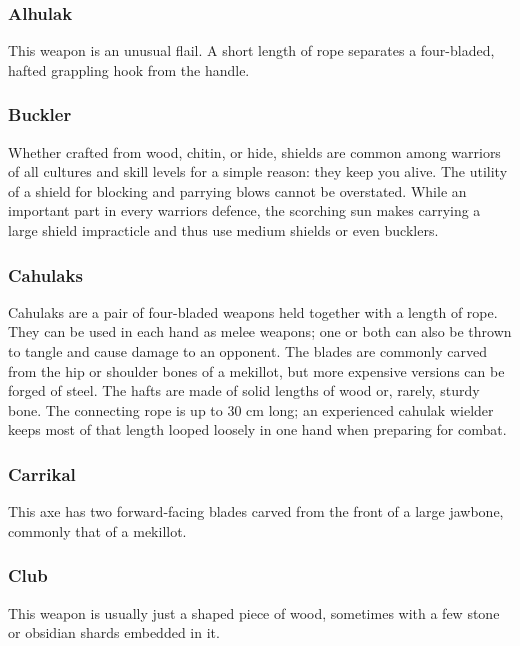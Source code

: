 \begin{multicols}{2}

\subsubsection{Alhulak}
\label{itmmlee:alhulak}
This weapon is an unusual flail. A short length of rope separates
a four-bladed, hafted grappling hook from the handle.

\subsubsection{Buckler}
\label{itmmlee:buckler}
Whether crafted from wood, chitin, or hide, shields are
common among warriors of all cultures and skill levels for
a simple reason: they keep you alive. The utility of a shield
for blocking and parrying blows cannot be overstated. While
an important part in every warriors defence, the scorching sun
makes carrying a large shield impracticle and thus use medium
shields or even bucklers.

\subsubsection{Cahulaks}
\label{itmmlee:cahulaks}
Cahulaks are a pair of four-bladed weapons held together with a length of rope. They
can be used in each hand as melee weapons; one or both can also be thrown to tangle
and cause damage to an opponent. The blades are commonly carved from the hip or
shoulder bones of a mekillot, but more expensive versions can be forged of steel.
The hafts are made of solid lengths of wood or, rarely, sturdy bone. The connecting
rope is up to 30 cm long; an experienced cahulak wielder keeps most of that length
looped loosely in one hand when preparing for combat.

\subsubsection{Carrikal}
\label{itmmlee:carrikal}
This axe has two forward-facing blades carved from the front
of a large jawbone, commonly that of a mekillot.

\subsubsection{Club}
\label{itmmlee:club}
This weapon is usually just a shaped piece of wood, sometimes
with a few stone or obsidian shards embedded in it.


\end{multicols}
